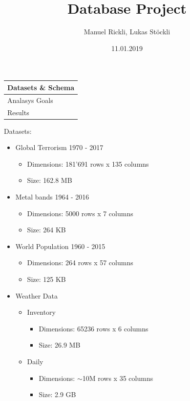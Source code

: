\documentclass{beamer}
\title              {Database Project}
\author             {Manuel Rickli, Lukas Stöckli}
\institute          {University of Basel}
\date               {11.01.2019}
\begin{document}
\begin{frame}[t,plain]
	\titlepage
\end{frame}


\begin{frame}
	\begin{tabularx}{\textwidth}{X}
		\hline
		\rowcolor{hcolor}
		Datasets \& Schema\\
		\hline
		Analasys Goals\\
		\hline
		Results\\
		\hline
	\end{tabularx}
\end{frame}


\begin{frame}{Datasets:}
	\begin{itemize}
		\item Global Terrorism 1970 - 2017
		\begin{itemize}
			\item Dimensions: 181'691 rows x 135 columns
			\item Size: 162.8 MB
		\end{itemize}
		\item Metal bands 1964 - 2016
		\begin{itemize}
			\item Dimensions: 5000 rows x 7 columns
			\item Size: 264 KB
		\end{itemize}
		\item World Population 1960 - 2015
		\begin{itemize}
			\item Dimensions: 264 rows x 57 columns
			\item Size: 125 KB
		\end{itemize}
		\item Weather Data
		\begin{itemize}
			\item Inventory
			\begin{itemize}
			  \item Dimensions: 65236 rows x 6 columns
			  \item Size: 26.9 MB
		    \end{itemize}
			\item Daily
			\begin{itemize}
			  \item Dimensions: $\sim$10M rows x 35 columns
			  \item Size: 2.9 GB
		    \end{itemize}
		\end{itemize}
	\end{itemize}
\end{frame}
\end{document}
